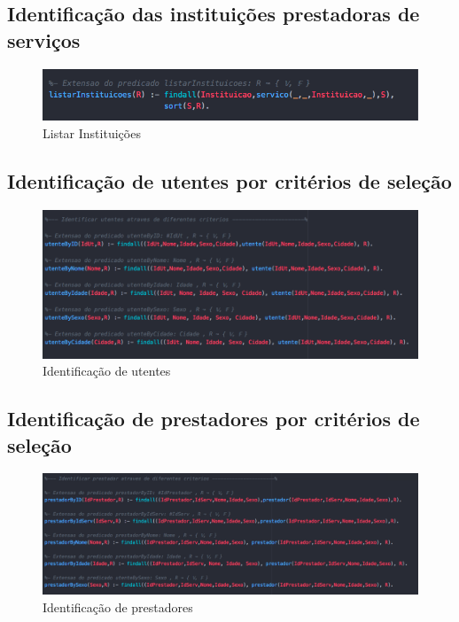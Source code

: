 \documentclass[25pt]{article}
\begin{document}
\subsection{Identificação das instituições prestadoras de serviços}

\begin{figure}[H]
\centering\includegraphics[scale=0.7]{listarI}
\caption{\label{fig:controller}Listar Instituições}
\end{figure}

\subsection{Identificação de utentes por critérios de seleção}
\begin{figure}[H]
\centering\includegraphics[scale=0.5]{criterioutente}
\caption{\label{fig:controller}Identificação de utentes}
\end{figure}

\subsection{Identificação de prestadores por critérios de seleção}
\begin{figure}[H]
\centering\includegraphics[scale=0.45]{prestador}
\caption{\label{fig:controller}Identificação de prestadores}
\end{figure}
\end{document}
